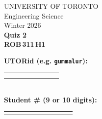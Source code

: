 \documentclass[12pt]{article}
\begin{document}
\newcommand{\spacer}{
  \vspace{5mm}\\
}

\newcommand{\hspacer}{\\
}

\noindent
\begin{minipage}{0.45\textwidth}
\large
\noindent  UNIVERSITY OF TORONTO\\
  Engineering Science\\[1.75ex]
  Winter 2026\\[1.75ex]
  \textbf{Quiz 2} \\
  \textbf{{ROB\,311\,H1}}
\end{minipage}%
\hspace{-1cm}
\begin{minipage}{0.6\textwidth}
\raggedleft
\textbf{UTORid (e.g. \texttt{gummalur}):} \\[1ex]
\begin{tabular}{|c|c|c|c|c|c|c|c|}
  \hline
  \hspace{1.2em}\; & \hspace{1.2em}\; & \hspace{1.2em}\; & \hspace{1.2em}\; & \hspace{1.2em}\; & \hspace{1.2em}\; & \hspace{1.2em}\; & \hspace{1.2em}\; \\
  \hspace{1.2em}\; & \hspace{1.2em}\; & \hspace{1.2em}\; & \hspace{1.2em}\; & \hspace{1.2em}\; & \hspace{1.2em}\; & \hspace{1.2em}\; & \hspace{1.2em}\;\\
  \hline
\end{tabular}\\[2ex]
\textbf{Student \# (9 or 10 digits):} \\[1ex]
\begin{tabular}{|c|c|c|c|c|c|c|c|c|c|}
  \hline
  \hspace{1.2em}\; & \hspace{1.2em}\; & \hspace{1.2em}\; & \hspace{1.2em}\; & \hspace{1.2em}\; & \hspace{1.2em}\; & \hspace{1.2em}\; & \hspace{1.2em}\; & \hspace{1.2em}\; & \hspace{1.2em}\; \\

\end{tabular}
\end{minipage}
\end{document}
